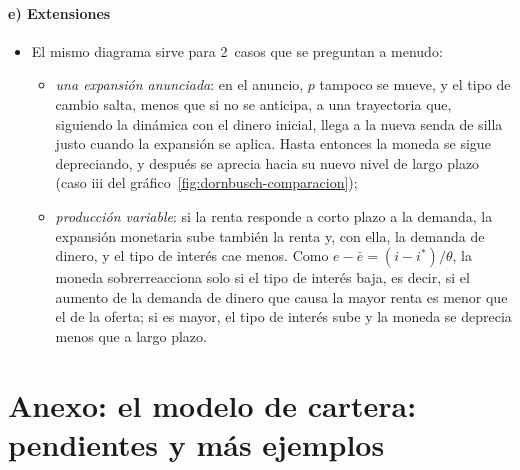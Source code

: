 \documentclass[11pt]{article}
\begin{document}
\paragraph{e) Extensiones}
\begin{itemize}
\item El mismo diagrama sirve para 2~casos que se preguntan a menudo:
  \begin{itemize}
  \item \emph{una expansión anunciada}: en el anuncio, $p$ tampoco se mueve, y el tipo de cambio salta, menos que si no se anticipa, a una trayectoria que, siguiendo la dinámica con el dinero inicial, llega a la nueva senda de silla justo cuando la expansión se aplica. Hasta entonces la moneda se sigue depreciando, y después se aprecia hacia su nuevo nivel de largo plazo\nocite{Wilson1979Anticipated} (caso iii del gráfico~\ref{fig:dornbusch-comparacion});
  \item \emph{producción variable}: si la renta responde a corto plazo a la demanda, la expansión monetaria sube también la renta y, con ella, la demanda de dinero, y el tipo de interés cae menos. Como $e-\bar e=(i-i^*)/\theta$, la moneda sobrerreacciona solo si el tipo de interés baja, es decir, si el aumento de la demanda de dinero que causa la mayor renta es menor que el de la oferta; si es mayor, el tipo de interés sube y la moneda se deprecia menos que a largo plazo\nocite{Dornbusch1976Expectations}.
  \end{itemize}
\end{itemize}

\section{Anexo: el modelo de cartera: pendientes y más ejemplos}\label{anexo:cartera}
\end{document}
